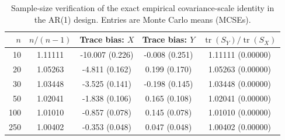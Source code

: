 \begin{table}[htbp]\centering\small\caption{Sample-size verification of the exact empirical covariance-scale identity in the AR(1) design. Entries are Monte Carlo means (MCSEs).}\label{tab:sample_size_trace}\begin{tabular}{rcccc}\hline\hline$n$ & $n/(n-1)$ & Trace bias: $X$ & Trace bias: $Y$ & $\operatorname{tr}(S_Y)/\operatorname{tr}(S_X)$ \\\hline10 & 1.11111 & -10.007 (0.226) & -0.008 (0.251) & 1.11111 (0.00000) \\
20 & 1.05263 & -4.811 (0.162) & 0.199 (0.170) & 1.05263 (0.00000) \\
30 & 1.03448 & -3.525 (0.141) & -0.198 (0.145) & 1.03448 (0.00000) \\
50 & 1.02041 & -1.838 (0.106) & 0.165 (0.108) & 1.02041 (0.00000) \\
100 & 1.01010 & -0.857 (0.078) & 0.145 (0.078) & 1.01010 (0.00000) \\
250 & 1.00402 & -0.353 (0.048) & 0.047 (0.048) & 1.00402 (0.00000) \\\hline\hline\end{tabular}\end{table}
